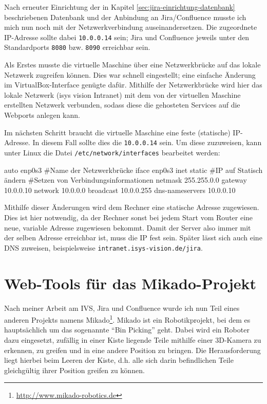 \documentclass[xcolor=dvipsnames,11pt,paper=a4paper]{report}
\begin{document}
Nach erneuter Einrichtung der in Kapitel \ref{sec:jira-einrichtung-datenbank} beschriebenen
Datenbank und der Anbindung an Jira/Confluence musste ich mich nun noch mit der
Netzwerkverbindung auseinandersetzen. Die zugeordnete IP-Adresse sollte dabei
\texttt{10.0.0.14} sein; Jira und Confluence jeweils unter den Standardports
\texttt{8080} bzw. \texttt{8090} erreichbar sein.

Als Erstes musste die virtuelle Maschine über eine Netzwerkbrücke auf das lokale
Netzwerk zugreifen können. Dies war schnell eingestellt; eine einfache Änderung
im VirtualBox-Interface genügte dafür. Mithilfe der Netzwerkbrücke wird hier das
lokale Netzwerk (isys vision Intranet) mit dem von der virtuellen Maschine erstellten
Netzwerk verbunden, sodass diese die gehosteten Services auf die Webports anlegen
kann.

Im nächsten Schritt braucht die virtuelle Maschine eine feste (statische) IP-Adresse.
In diesem Fall sollte dies die \texttt{10.0.0.14} sein. Um diese zuzuweisen, kann
unter Linux die Datei \texttt{/etc/network/interfaces} bearbeitet werden:
\begin{code}[language=bash, caption={Änderungen in \texttt{/etc/network/interfaces}}]
auto enp0s3 #Name der Netzwerkbrücke
iface enp0s3 inet static #IP auf Statisch ändern
#Setzen von Verbindungsinformationen
netmask 255.255.0.0
gateway 10.0.0.10
network 10.0.0.0
broadcast 10.0.0.255
dns-nameservers 10.0.0.10
\end{code}
Mithilfe dieser Änderungen wird dem Rechner eine statische Adresse zugewiesen. Dies
ist hier notwendig, da der Rechner sonst bei jedem Start vom Router eine neue, variable
Adresse zugewiesen bekommt. Damit der Server also immer mit der selben Adresse erreichbar
ist, muss die IP fest sein. Später lässt sich auch eine DNS zuweisen, beispielsweise
\texttt{intranet.isys-vision.de/jira}.




\chapter{Web-Tools für das Mikado-Projekt}

Nach meiner Arbeit am IVS, Jira und Confluence wurde ich nun Teil eines anderen
Projekts namens Mikado\footnote{\url{http://www.mikado-robotics.de}}. Mikado ist ein Robotikprojekt,
bei dem es hauptsächlich um das sogenannte ``Bin Picking'' geht. Dabei wird ein
Roboter dazu eingesetzt, zufällig in einer Kiste liegende Teile mithilfe einer 3D-Kamera
zu erkennen, zu greifen und in eine andere Position zu bringen. Die Herausforderung
liegt hierbei beim Leeren der Kiste, d.h. alle sich darin befindlichen Teile gleichgültig
ihrer Position greifen zu können.
\end{document}
